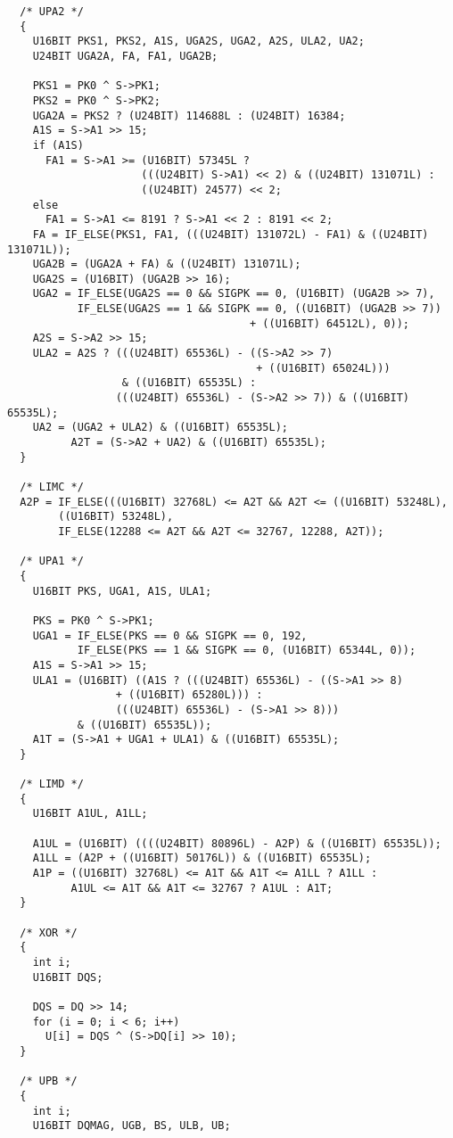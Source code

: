 \begin{verbatim}
  /* UPA2 */
  {
    U16BIT PKS1, PKS2, A1S, UGA2S, UGA2, A2S, ULA2, UA2;
    U24BIT UGA2A, FA, FA1, UGA2B;

    PKS1 = PK0 ^ S->PK1;
    PKS2 = PK0 ^ S->PK2;
    UGA2A = PKS2 ? (U24BIT) 114688L : (U24BIT) 16384;
    A1S = S->A1 >> 15;
    if (A1S)
      FA1 = S->A1 >= (U16BIT) 57345L ?
                     (((U24BIT) S->A1) << 2) & ((U24BIT) 131071L) :
                     ((U24BIT) 24577) << 2;
    else
      FA1 = S->A1 <= 8191 ? S->A1 << 2 : 8191 << 2;
    FA = IF_ELSE(PKS1, FA1, (((U24BIT) 131072L) - FA1) & ((U24BIT) 131071L));
    UGA2B = (UGA2A + FA) & ((U24BIT) 131071L);
    UGA2S = (U16BIT) (UGA2B >> 16);
    UGA2 = IF_ELSE(UGA2S == 0 && SIGPK == 0, (U16BIT) (UGA2B >> 7),
           IF_ELSE(UGA2S == 1 && SIGPK == 0, ((U16BIT) (UGA2B >> 7))
                                      + ((U16BIT) 64512L), 0));
    A2S = S->A2 >> 15;
    ULA2 = A2S ? (((U24BIT) 65536L) - ((S->A2 >> 7)
                                       + ((U16BIT) 65024L)))
                  & ((U16BIT) 65535L) :
                 (((U24BIT) 65536L) - (S->A2 >> 7)) & ((U16BIT) 65535L);
    UA2 = (UGA2 + ULA2) & ((U16BIT) 65535L);
          A2T = (S->A2 + UA2) & ((U16BIT) 65535L);
  }

  /* LIMC */
  A2P = IF_ELSE(((U16BIT) 32768L) <= A2T && A2T <= ((U16BIT) 53248L),
        ((U16BIT) 53248L),
        IF_ELSE(12288 <= A2T && A2T <= 32767, 12288, A2T));

  /* UPA1 */
  {
    U16BIT PKS, UGA1, A1S, ULA1;

    PKS = PK0 ^ S->PK1;
    UGA1 = IF_ELSE(PKS == 0 && SIGPK == 0, 192,
           IF_ELSE(PKS == 1 && SIGPK == 0, (U16BIT) 65344L, 0));
    A1S = S->A1 >> 15;
    ULA1 = (U16BIT) ((A1S ? (((U24BIT) 65536L) - ((S->A1 >> 8)
                 + ((U16BIT) 65280L))) :
                 (((U24BIT) 65536L) - (S->A1 >> 8)))
           & ((U16BIT) 65535L));
    A1T = (S->A1 + UGA1 + ULA1) & ((U16BIT) 65535L);
  }

  /* LIMD */
  {
    U16BIT A1UL, A1LL;

    A1UL = (U16BIT) ((((U24BIT) 80896L) - A2P) & ((U16BIT) 65535L));
    A1LL = (A2P + ((U16BIT) 50176L)) & ((U16BIT) 65535L);
    A1P = ((U16BIT) 32768L) <= A1T && A1T <= A1LL ? A1LL :
          A1UL <= A1T && A1T <= 32767 ? A1UL : A1T;
  }

  /* XOR */
  {
    int i;
    U16BIT DQS;

    DQS = DQ >> 14;
    for (i = 0; i < 6; i++)
      U[i] = DQS ^ (S->DQ[i] >> 10);
  }

  /* UPB */
  {
    int i;
    U16BIT DQMAG, UGB, BS, ULB, UB;


\end{verbatim}
